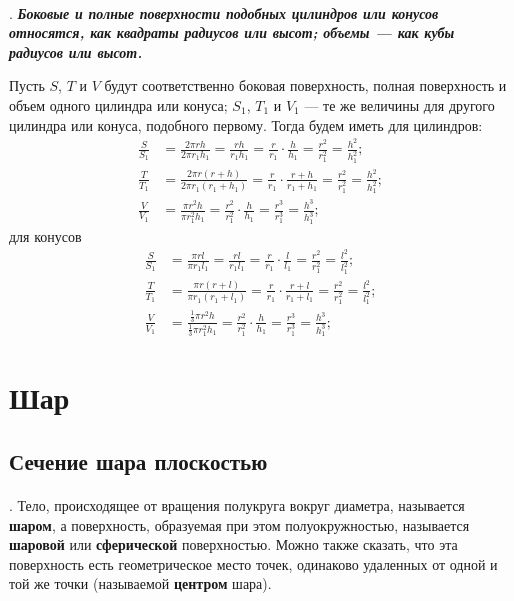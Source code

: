 \documentclass[twoside]{book}
\begin{document}
\paragraph{}\label{1938/s124}
.
\textbf{\emph{Боковые и полные поверхности подобных цилиндров или конусов относятся, как квадраты радиусов или высот;
объемы --- как кубы радиусов или высот.}}

Пусть $S$, $T$ и $V$ будут соответственно боковая поверхность, полная поверхность и объем одного цилиндра или конуса;
$S_1$, $T_1$ и $V_1$ --- те же величины для другого цилиндра или конуса, подобного первому.
Тогда будем иметь для цилиндров:
\begin{align*}
\frac S{S_1}&=
\frac{2\pi rh}{2\pi r_1h_1}=
\frac{rh}{r_1h_1}=
\frac{r}{r_1}\cdot \frac{h}{h_1}=
\frac{r^2}{r_1^2}=
\frac{h^2}{h_1^2};
\\
\frac T{T_1}&=
\frac{2\pi r(r+h)}{2\pi r_1(r_1+h_1)}=
\frac{r}{r_1}\cdot\frac{r+h}{r_1+h_1}=
\frac{r^2}{r_1^2}=
\frac{h^2}{h_1^2};
\\
\frac V{V_1}&=
\frac{\pi r^2h}{\pi r_1^2h_1}=
\frac{r^2}{r_1^2}\cdot \frac{h}{h_1}=
\frac{r^3}{r_1^3}=
\frac{h^3}{h_1^3};
\end{align*}
для конусов
\begin{align*}
\frac S{S_1}&=
\frac{\pi rl}{\pi r_1l_1}=
\frac{rl}{r_1l_1}=
\frac{r}{r_1}\cdot \frac{l}{l_1}=
\frac{r^2}{r_1^2}=
\frac{l^2}{l_1^2};
\\
\frac T{T_1}&=
\frac{\pi r(r+l)}{\pi r_1(r_1+l_1)}=
\frac{r}{r_1}\cdot\frac{r+l}{r_1+l_1}=
\frac{r^2}{r_1^2}=
\frac{l^2}{l_1^2};
\\
\frac V{V_1}&=
\frac{\frac13\pi r^2h}{\frac13\pi r_1^2h_1}=
\frac{r^2}{r_1^2}\cdot \frac{h}{h_1}=
\frac{r^3}{r_1^3}=
\frac{h^3}{h_1^3};
\end{align*}

\section{Шар}

\subsection*{Сечение шара плоскостью}

\paragraph{}\label{1938/s125}
.
Тело, происходящее от вращения полукруга вокруг диаметра, называется \textbf{шаром}, а поверхность, образуемая при этом полуокружностью, называется \textbf{шаровой} или \textbf{сферической} поверхностью. %
Можно также сказать, что эта поверхность есть геометрическое место точек, одинаково удаленных от одной и той же точки (называемой \textbf{центром} шара).
\end{document}
